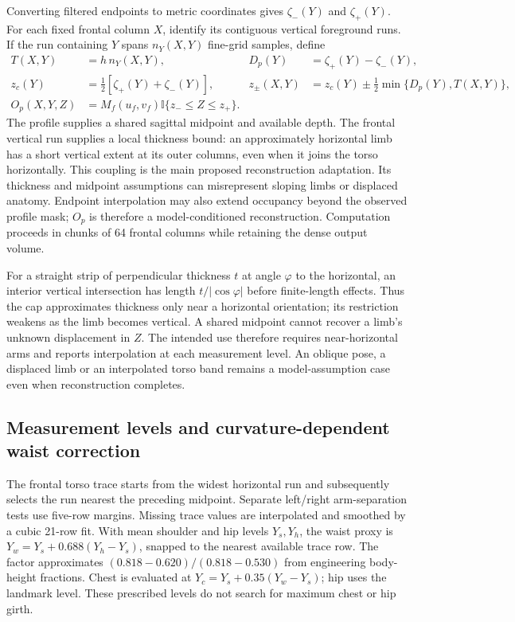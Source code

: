 \documentclass[11pt,a4paper]{article}
\newcommand{\indic}{\mathbb I}
\begin{document}
Converting filtered endpoints to metric coordinates gives $\zeta_-(Y)$ and $\zeta_+(Y)$. For each fixed frontal column $X$, identify its contiguous vertical foreground runs. If the run containing $Y$ spans $n_Y(X,Y)$ fine-grid samples, define
\begin{equation}
 \begin{aligned}
 T(X,Y)&=h\,n_Y(X,Y),&
 D_p(Y)&=\zeta_+(Y)-\zeta_-(Y),\\
 z_c(Y)&=\tfrac12[\zeta_+(Y)+\zeta_-(Y)],&
 z_\pm(X,Y)&=z_c(Y)\pm\tfrac12\min\{D_p(Y),T(X,Y)\},\\
 O_p(X,Y,Z)&=M_f(u_f,v_f)\indic\{z_-\leq Z\leq z_+\}.&&
 \end{aligned}
 \label{eq:profile}
\end{equation}
The profile supplies a shared sagittal midpoint and available depth. The frontal vertical run supplies a local thickness bound: an approximately horizontal limb has a short vertical extent at its outer columns, even when it joins the torso horizontally. This coupling is the main proposed reconstruction adaptation. Its thickness and midpoint assumptions can misrepresent sloping limbs or displaced anatomy. Endpoint interpolation may also extend occupancy beyond the observed profile mask; $O_p$ is therefore a model-conditioned reconstruction. Computation proceeds in chunks of 64 frontal columns while retaining the dense output volume.

For a straight strip of perpendicular thickness $t$ at angle $\varphi$ to the horizontal, an interior vertical intersection has length $t/|\cos\varphi|$ before finite-length effects. Thus the cap approximates thickness only near a horizontal orientation; its restriction weakens as the limb becomes vertical. A shared midpoint cannot recover a limb's unknown displacement in $Z$. The intended use therefore requires near-horizontal arms and reports interpolation at each measurement level. An oblique pose, a displaced limb or an interpolated torso band remains a model-assumption case even when reconstruction completes.

\subsection{Measurement levels and curvature-dependent waist correction}
The frontal torso trace starts from the widest horizontal run and subsequently selects the run nearest the preceding midpoint. Separate left/right arm-separation tests use five-row margins. Missing trace values are interpolated and smoothed by a cubic 21-row fit. With mean shoulder and hip levels $Y_s,Y_h$, the waist proxy is $Y_w=Y_s+0.688(Y_h-Y_s)$, snapped to the nearest available trace row. The factor approximates $(0.818-0.620)/(0.818-0.530)$ from engineering body-height fractions. Chest is evaluated at $Y_c=Y_s+0.35(Y_w-Y_s)$; hip uses the landmark level. These prescribed levels do not search for maximum chest or hip girth.
\end{document}
